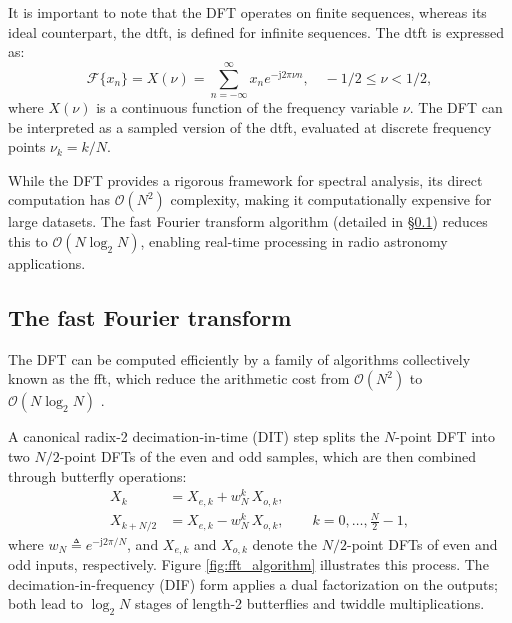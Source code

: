It is important to note that the DFT operates on finite sequences, whereas its ideal counterpart, the \gls{dtft}, is defined for infinite sequences. The \gls{dtft} is expressed as:
\begin{equation}
\mathcal{F}\{x_n\} = X(\nu) = \sum_{n=-\infty}^{\infty} x_n e^{-\mathrm{j} 2\pi\nu n}, \quad -1/2 \leq \nu < 1/2,
\label{eq:dtft}
\end{equation}
where $X(\nu)$ is a continuous function of the frequency variable $\nu$. The DFT can be interpreted as a sampled version of the \gls{dtft}, evaluated at discrete frequency points $\nu_k = k / N$.

While the DFT provides a rigorous framework for spectral analysis, its direct computation has $\mathcal{O}(N^2)$ complexity, making it computationally expensive for large datasets. The fast Fourier transform algorithm (detailed in \S\ref{sec:fft}) reduces this to $\mathcal{O}(N \log_2 N)$, enabling real-time processing in radio astronomy applications. 

\subsection{The fast Fourier transform}
\label{sec:fft}
The DFT can be computed efficiently by a family of algorithms collectively known as the \gls{fft}, which reduce the arithmetic cost from $\mathcal{O}(N^2)$ to $\mathcal{O}(N\log_2 N)$ \citep{CooleyTukey1965,OppenheimSchafer2010}.

A canonical radix-2 decimation-in-time (DIT) step splits the $N$-point DFT into two $N/2$-point DFTs of the even and odd samples, which are then combined through butterfly operations:
\begin{align}
X_k &= X_{e,k} + w_N^k\, X_{o,k},\\
X_{k+N/2} &= X_{e,k} - w_N^k\, X_{o,k}, \qquad k=0,\dots,\tfrac{N}{2}-1,
\end{align}
where $w_N \triangleq e^{-\mathrm{j}2\pi/N}$, and $X_{e,k}$ and $X_{o,k}$ denote the $N/2$-point DFTs of even and odd inputs, respectively. Figure \ref{fig:fft_algorithm} illustrates this process. The decimation-in-frequency (DIF) form applies a dual factorization on the outputs; both lead to $\log_2 N$ stages of length-2 butterflies and twiddle multiplications.


